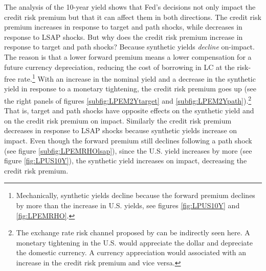 {The analysis of the 10-year yield shows that Fed's decisions not only impact the credit risk premium but that it can affect them in both directions.
The credit risk premium increases in response to target and path shocks, while decreases in response to LSAP shocks.
But why does the credit risk premium increase in response to target and path shocks?
Because synthetic yields \textit{decline} on-impact.
The reason is that a lower forward premium means a lower compensation for a future currency depreciation, reducing the cost of borrowing in LC at the risk-free rate.\footnote{ Mechanically, synthetic yields decline because the forward premium declines by more than the increase in U.S. yields, see figures \ref{fig:LPUS10Y} and \ref{fig:LPEMRHO}.}
With an increase in the nominal yield and a decrease in the synthetic yield in response to a monetary tightening, the credit risk premium goes up (see the right panels of figures \ref{subfig:LPEM2Ytarget} and \ref{subfig:LPEM2Ypath}).\footnote{ The exchange rate risk channel proposed by \cite{HofmannShimShin:2019} can be indirectly seen here. A monetary tightening in the U.S. would appreciate the dollar and depreciate the domestic currency. A currency appreciation would associated with an increase in the credit risk premium and vice versa.}
That is, target and path shocks have opposite effects on the synthetic yield and on the credit risk premium on impact.
Similarly the credit risk premium decreases in response to LSAP shocks because synthetic yields increase on impact.
Even though the forward premium still declines following a path shock (see figure \ref{subfig:LPEMRHOlsap}), since the U.S. yield increases by more (see figure \ref{fig:LPUS10Y}), the synthetic yield increases on impact, decreasing the credit risk premium. 
}

